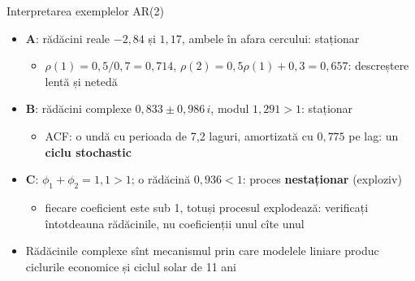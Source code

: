 \begin{frame}{Interpretarea exemplelor AR(2)}
\itemsize{\small}
\begin{itemize}
    \item \textbf{A}: rădăcini reale $\ensuremath{-}2{,}84$ și $1{,}17$, ambele în afara cercului: staționar
    \begin{itemize}
        \item $\rho(1) = 0{,}5/0{,}7 = 0{,}714$, $\rho(2) = 0{,}5\rho(1) + 0{,}3 = 0{,}657$: descreștere lentă și netedă
    \end{itemize}
    \item \textbf{B}: rădăcini complexe $0{,}833 \pm 0{,}986\,i$, modul $1{,}291 > 1$: staționar
    \begin{itemize}
        \item ACF: o undă cu perioada de 7{,}2 laguri, amortizată cu $0{,}775$ pe lag: un \textbf{ciclu stochastic}
    \end{itemize}
    \item \textbf{C}: $\phi_1 + \phi_2 = 1{,}1 > 1$; o rădăcină $0{,}936 < 1$: proces \textbf{nestaționar} (exploziv)
    \begin{itemize}
        \item fiecare coeficient este sub 1, totuși procesul explodează: verificați întotdeauna rădăcinile, nu coeficienții unul cîte unul
    \end{itemize}
    \item Rădăcinile complexe sînt mecanismul prin care modelele liniare produc ciclurile economice și ciclul solar de 11 ani
\end{itemize}
\end{frame}

